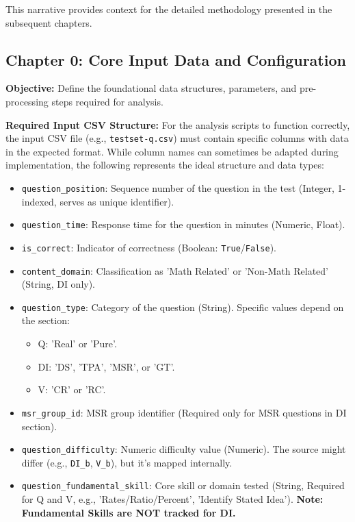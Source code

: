 \documentclass{article}
\begin{document}
This narrative provides context for the detailed methodology presented in the subsequent chapters.

\subsection{Chapter 0: Core Input Data and Configuration}

\textbf{Objective:} Define the foundational data structures, parameters, and pre-processing steps required for analysis.

\textbf{Required Input CSV Structure:}
For the analysis scripts to function correctly, the input CSV file (e.g., \texttt{testset-q.csv}) must contain specific columns with data in the expected format. While column names can sometimes be adapted during implementation, the following represents the ideal structure and data types:

\begin{itemize}
    \item \texttt{question\_position}: Sequence number of the question in the test (Integer, 1-indexed, serves as unique identifier).
    \item \texttt{question\_time}: Response time for the question in minutes (Numeric, Float).
    \item \texttt{is\_correct}: Indicator of correctness (Boolean: \texttt{True}/\texttt{False}).
    \item \texttt{content\_domain}: Classification as 'Math Related' or 'Non-Math Related' (String, DI only).
    \item \texttt{question\_type}: Category of the question (String). Specific values depend on the section:
        \begin{itemize}
            \item Q: 'Real' or 'Pure'.
            \item DI: 'DS', 'TPA', 'MSR', or 'GT'.
            \item V: 'CR' or 'RC'.
        \end{itemize}
    \item \texttt{msr\_group\_id}: MSR group identifier (Required only for MSR questions in DI section).
    \item \texttt{question\_difficulty}: Numeric difficulty value (Numeric). The source might differ (e.g., \texttt{DI\_b}, \texttt{V\_b}), but it's mapped internally.
    \item \texttt{question\_fundamental\_skill}: Core skill or domain tested (String, Required for Q and V, e.g., 'Rates/Ratio/Percent', 'Identify Stated Idea'). \textbf{Note: Fundamental Skills are NOT tracked for DI.}
\end{itemize}
\end{document}
